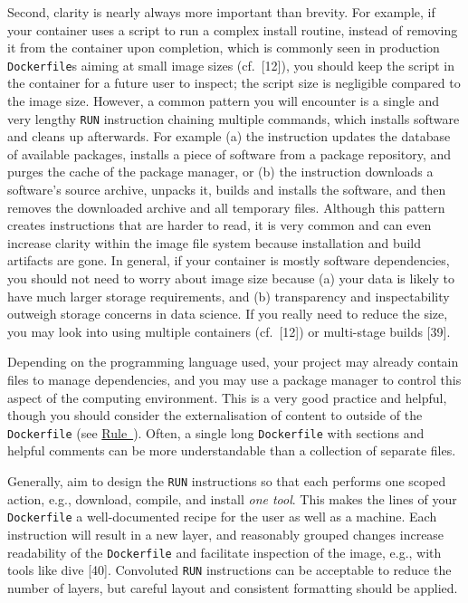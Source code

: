 \documentclass[10pt,letterpaper]{article}
\begin{document}
Second, clarity is nearly always more important than brevity. For
example, if your container uses a script to run a complex install
routine, instead of removing it from the container upon completion,
which is commonly seen in production \texttt{Dockerfile}s aiming at
small image sizes (cf.~{[}12{]}), you should keep the script in the
container for a future user to inspect; the script size is negligible
compared to the image size. However, a common pattern you will encounter
is a single and very lengthy \texttt{RUN} instruction chaining multiple
commands, which installs software and cleans up afterwards. For example
(a) the instruction updates the database of available packages, installs
a piece of software from a package repository, and purges the cache of
the package manager, or (b) the instruction downloads a software's
source archive, unpacks it, builds and installs the software, and then
removes the downloaded archive and all temporary files. Although this
pattern creates instructions that are harder to read, it is very common
and can even increase clarity within the image file system because
installation and build artifacts are gone. In general, if your container
is mostly software dependencies, you should not need to worry about
image size because (a) your data is likely to have much larger storage
requirements, and (b) transparency and inspectability outweigh storage
concerns in data science. If you really need to reduce the size, you may
look into using multiple containers (cf.~{[}12{]}) or multi-stage builds
{[}39{]}.

Depending on the programming language used, your project may already
contain files to manage dependencies, and you may use a package manager
to control this aspect of the computing environment. This is a very good
practice and helpful, though you should consider the externalisation of
content to outside of the \texttt{Dockerfile} (see
\hyperref[{rule:mount}]{Rule~}). Often, a single
long \texttt{Dockerfile} with sections and helpful comments can be more
understandable than a collection of separate files.

Generally, aim to design the \texttt{RUN} instructions so that each
performs one scoped action, e.g., download, compile, and install
\emph{one tool}. This makes the lines of your \texttt{Dockerfile} a
well-documented recipe for the user as well as a machine. Each
instruction will result in a new layer, and reasonably grouped changes
increase readability of the \texttt{Dockerfile} and facilitate
inspection of the image, e.g., with tools like dive {[}40{]}. Convoluted
\texttt{RUN} instructions can be acceptable to reduce the number of
layers, but careful layout and consistent formatting should be applied.
\end{document}
